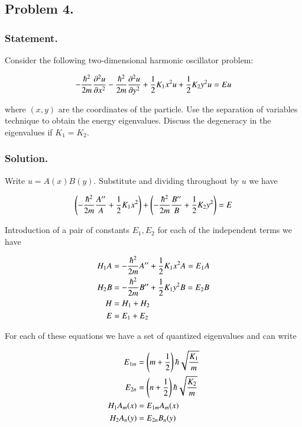 \subsection{Problem 4.}
\subsubsection{Statement.}

Consider the following two-dimensional harmonic oscillator problem:

\begin{align}\label{eqn:desaiCh9:400}
-\frac{\hbar^2}{2m} \frac{\partial^2 u}{\partial x^2}
-\frac{\hbar^2}{2m} \frac{\partial^2 u}{\partial y^2}
+ \frac{1}{2} K_1 x^2 u
+ \frac{1}{2} K_2 y^2 u
= E u
\end{align}

where $(x,y)$ are the coordinates of the particle.  Use the separation of variables technique to obtain the energy eigenvalues.  Discuss the degeneracy in the eigenvalues if $K_1 = K_2$.

\subsubsection{Solution.}

Write $u = A(x) B(y)$.  Substitute and dividing throughout by $u$ we have

\begin{align}\label{eqn:desaiCh9:401}
\left( -\frac{\hbar^2}{2m} \frac{A''}{A} + \frac{1}{2} K_1 x^2 \right)
+\left( -\frac{\hbar^2}{2m} \frac{B''}{B} + \frac{1}{2} K_2 y^2 \right)
= E
\end{align}

Introduction of a pair of constants $E_1, E_2$ for each of the independent terms we have

\begin{align}\label{eqn:desaiCh9:403}
H_1 A &= -\frac{\hbar^2}{2m} A'' + \frac{1}{2} K_1 x^2 A = E_1 A \\
H_2 B &= -\frac{\hbar^2}{2m} B'' + \frac{1}{2} K_1 y^2 B = E_2 B \\
H &= H_1 + H_2 \\
E  &= E_1 + E_2
\end{align}

For each of these equations we have a set of quantized eigenvalues and can write

\begin{align}\label{eqn:desaiCh9:404}
E_{1m} &= \left(m + \frac{1}{2}\right) \hbar \sqrt{\frac{K_1}{m}} \\
E_{2n} &= \left(n + \frac{1}{2}\right) \hbar \sqrt{\frac{K_2}{m}} \\
H_1 A_m(x) &= E_{1m} A_m(x) \\
H_2 A_n(y) &= E_{2n} B_n(y)
\end{align}

